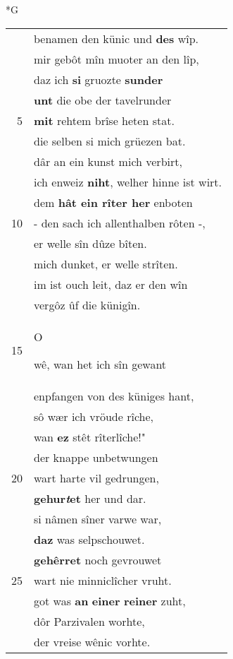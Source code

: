 \documentclass[8pt,a4paper,notitlepage]{article}
\begin{document}
\begin{table}[ht]
\begin{minipage}[t]{0.5\linewidth}
\small
\begin{center}*G
\end{center}
\begin{tabular}{rl}
 & benamen den künic und \textbf{des} wîp.\\ 
 & mir gebôt mîn muoter an den lîp,\\ 
 & daz ich \textbf{si} gruozte \textbf{sunder}\\ 
 & \textbf{unt} die obe der tavelrunder\\ 
5 & \textbf{mit} rehtem brîse heten stat.\\ 
 & die selben si mich grüezen bat.\\ 
 & dâr an ein kunst mich verbirt,\\ 
 & ich enweiz \textbf{niht}, welher hinne ist wirt.\\ 
 & dem \textbf{hât ein rîter her} enboten\\ 
10 & - den sach ich allenthalben rôten -,\\ 
 & er welle sîn dûze bîten.\\ 
 & mich dunket, er welle strîten.\\ 
 & im ist ouch leit, daz er den wîn\\ 
 & vergôz ûf die künigîn.\\ 
15 & \begin{large}O\end{large}wê, wan het ich sîn gewant\\ 
 & enpfangen von des küniges hant,\\ 
 & sô wær ich vröude rîche,\\ 
 & wan \textbf{ez} stêt rîterlîche!"\\ 
 & der knappe unbetwungen\\ 
20 & wart harte vil gedrungen,\\ 
 & \textbf{gehur\textit{t}et} her und dar.\\ 
 & si nâmen sîner varwe war,\\ 
 & \textbf{daz} was selpschouwet.\\ 
 & \textbf{gehêrret} noch gevrouwet\\ 
25 & wart nie minniclîcher vruht.\\ 
 & got was \textbf{an} \textbf{einer} \textbf{reiner} zuht,\\ 
 & dôr Parzivalen worhte,\\ 
 & der vreise wênic vorhte.\\ 

\end{tabular}
\end{minipage}
\end{table}
\end{document}
